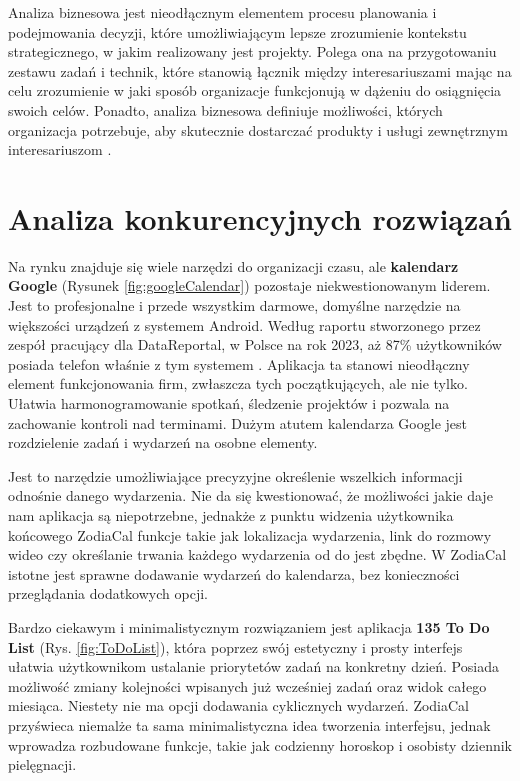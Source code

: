 \phantom{Th}
Analiza biznesowa jest nieodłącznym elementem procesu planowania i podejmowania
decyzji, które umożliwiającym lepsze zrozumienie kontekstu strategicznego, w jakim
realizowany jest projekty. Polega ona na przygotowaniu zestawu zadań i technik, które
stanowią łącznik między interesariuszami mając na celu zrozumienie w jaki sposób organizacje
funkcjonują w dążeniu do osiągnięcia swoich celów. Ponadto, analiza biznesowa definiuje
możliwości, których organizacja potrzebuje, aby skutecznie dostarczać produkty i usługi
zewnętrznym interesariuszom \cite{businessanalysis}.

\section{Analiza konkurencyjnych rozwiązań}

\phantom{Th}
Na rynku znajduje się wiele narzędzi do organizacji czasu, ale \textbf{kalendarz Google} (Rysunek \ref{fig:googleCalendar}) pozostaje niekwestionowanym liderem. Jest to profesjonalne i przede wszystkim darmowe, domyślne narzędzie na większości urządzeń z systemem Android.
Według raportu stworzonego przez zespół pracujący dla DataReportal, w Polsce na rok 2023, aż 87\% użytkowników posiada
telefon właśnie z tym systemem \cite{datareportal}. Aplikacja ta stanowi nieodłączny element funkcjonowania firm, zwłaszcza tych początkujących,
ale nie tylko. Ułatwia harmonogramowanie spotkań, śledzenie projektów i pozwala na zachowanie kontroli nad terminami.
Dużym atutem kalendarza Google jest rozdzielenie zadań i wydarzeń na osobne elementy.

Jest to narzędzie umożliwiające precyzyjne określenie wszelkich informacji odnośnie danego wydarzenia.
Nie da się kwestionować, że możliwości jakie daje nam aplikacja są niepotrzebne,
jednakże z punktu widzenia użytkownika końcowego ZodiaCal funkcje takie jak lokalizacja wydarzenia,
link do rozmowy wideo czy określanie trwania każdego wydarzenia od do jest zbędne.
W ZodiaCal istotne jest sprawne dodawanie wydarzeń do kalendarza, bez konieczności przeglądania dodatkowych opcji.

\newpage
Bardzo ciekawym i minimalistycznym rozwiązaniem jest aplikacja \textbf{135 To Do List} (Rys. \ref{fig:ToDoList}), która poprzez swój estetyczny
i prosty interfejs ułatwia użytkownikom ustalanie priorytetów zadań na konkretny dzień.
Posiada możliwość zmiany kolejności wpisanych już wcześniej zadań oraz widok całego miesiąca.
Niestety nie ma opcji dodawania cyklicznych wydarzeń. ZodiaCal przyświeca niemalże ta sama minimalistyczna idea tworzenia interfejsu, jednak wprowadza rozbudowane funkcje, takie jak codzienny horoskop i osobisty dziennik pielęgnacji.

